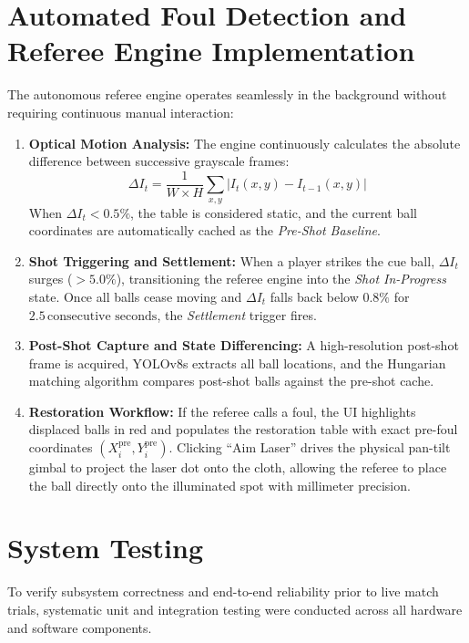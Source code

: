 \section{Automated Foul Detection and Referee Engine Implementation}
The autonomous referee engine operates seamlessly in the background without requiring continuous manual interaction:
\begin{enumerate}
    \item \textbf{Optical Motion Analysis:} The engine continuously calculates the absolute difference between successive grayscale frames:
    \begin{equation}
        \Delta I_t = \frac{1}{W \times H} \sum_{x, y} |I_t(x, y) - I_{t-1}(x, y)|
    \end{equation}
    When $\Delta I_t < 0.5\%$, the table is considered static, and the current ball coordinates are automatically cached as the \textit{Pre-Shot Baseline}.
    \item \textbf{Shot Triggering and Settlement:} When a player strikes the cue ball, $\Delta I_t$ surges ($>5.0\%$), transitioning the referee engine into the \textit{Shot In-Progress} state. Once all balls cease moving and $\Delta I_t$ falls back below $0.8\%$ for $2.5\,\text{consecutive seconds}$, the \textit{Settlement} trigger fires.
    \item \textbf{Post-Shot Capture and State Differencing:} A high-resolution post-shot frame is acquired, YOLOv8s extracts all ball locations, and the Hungarian matching algorithm compares post-shot balls against the pre-shot cache.
    \item \textbf{Restoration Workflow:} If the referee calls a foul, the UI highlights displaced balls in red and populates the restoration table with exact pre-foul coordinates $(X_i^{\text{pre}}, Y_i^{\text{pre}})$. Clicking ``Aim Laser'' drives the physical pan-tilt gimbal to project the laser dot onto the cloth, allowing the referee to place the ball directly onto the illuminated spot with millimeter precision.
\end{enumerate}

\section{System Testing}
To verify subsystem correctness and end-to-end reliability prior to live match trials, systematic unit and integration testing were conducted across all hardware and software components.

